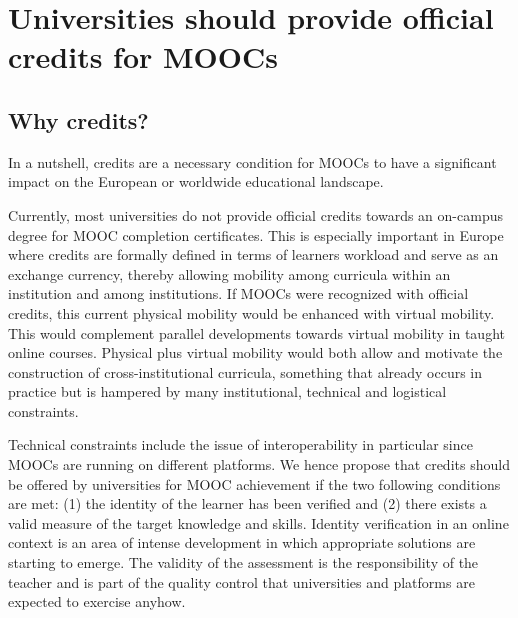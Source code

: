 \section{Universities should provide official credits for MOOCs}
\label{sec:credit}
 

\subsection{Why credits?}

In a nutshell, credits are a necessary condition for MOOCs to have a significant impact on  the European or
worldwide educational landscape. 

Currently, most universities do not provide official credits towards an
on-campus degree for MOOC
completion certificates.
This is especially important in Europe where
credits are formally defined in terms of learners workload and serve as
an exchange currency, thereby allowing mobility among curricula within an
institution and among institutions. If MOOCs were recognized with official
credits, this current physical mobility would be enhanced with 
virtual mobility.  This would complement parallel developments towards virtual mobility in taught online courses.
Physical plus virtual mobility would both allow and motivate
the construction of cross-institutional curricula, something that
already occurs in practice but is hampered by
many institutional, technical and logistical constraints. 


Technical constraints include the issue of interoperability in particular since MOOCs are 
running on different platforms. 
We hence propose that credits should be offered 
by universities for MOOC achievement if the two following conditions are met: (1) the identity of the
learner has been verified and (2) there exists a valid
measure of the target knowledge and skills. Identity verification in an online context
is an area of intense development in which appropriate solutions are
starting to emerge. The validity of the assessment is the responsibility of
the teacher and is part of the quality control that universities and
platforms are expected to exercise anyhow.

